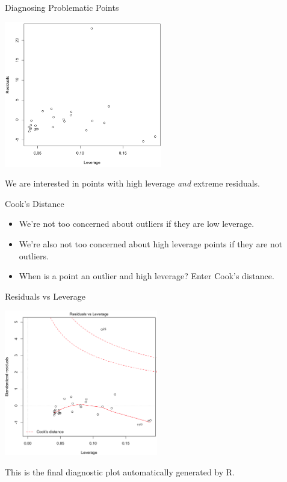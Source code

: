 \begin{frame}{Diagnosing Problematic Points}
    \vspace{-0.5cm}\begin{center}
        \includegraphics[height=2.5in]{images/reslev.png}
    \end{center}
    We are interested in points with high leverage \textit{and} extreme residuals.
\end{frame}

\begin{frame}{Cook's Distance}
    \begin{itemize}
        \item We're not too concerned about outliers if they are low leverage.
        \item We're also not too concerned about high leverage points if they are not outliers.
        \item When is a point an outlier and high leverage? Enter Cook's distance.
    \end{itemize}
\end{frame}

\begin{frame}{Residuals vs Leverage}
    \vspace{-0.5cm}\begin{center}
        \includegraphics[height=2.5in]{images/residlev.png}
    \end{center}
    This is the final diagnostic plot automatically generated by R.
\end{frame}

